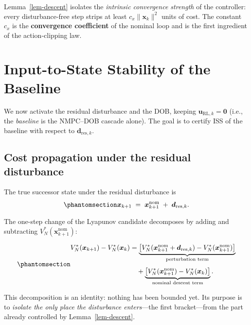 \documentclass[
  11pt,
]{article}
\theoremstyle{plain}
\theoremstyle{plain}
\theoremstyle{definition}
\theoremstyle{remark}
\begin{document}
Lemma~\ref{lem-descent} isolates the \emph{intrinsic convergence
strength} of the controller: every disturbance-free step strips at least
\(c_x\|\bm{x}_k\|^2\) units of cost. The constant \(c_x\) is the
\textbf{convergence coefficient} of the nominal loop and is the first
ingredient of the action-clipping law.

\section{Input-to-State Stability of the Baseline}\label{sec-iss}

We now activate the residual disturbance and the DOB, keeping
\(\bm{u}_{\mathrm{RL},k} = \bm{0}\) (i.e., the \emph{baseline} is the
NMPC--DOB cascade alone). The goal is to certify ISS of the baseline
with respect to \(\bm{d}_{\mathrm{res},k}\).

\subsection{Cost propagation under the residual
disturbance}\label{cost-propagation-under-the-residual-disturbance}

The true successor state under the residual disturbance is
\begin{equation}\protect\phantomsection\label{eq-disturbed-succ}{
\bm{x}_{k+1} \;=\; \bm{x}_{k+1}^{\mathrm{nom}}
\;+\; \bm{d}_{\mathrm{res},k}.
}\end{equation}

The one-step change of the Lyapunov candidate decomposes by adding and
subtracting \(V_N^*(\bm{x}_{k+1}^{\mathrm{nom}})\):

\begin{equation}\protect\phantomsection\label{eq-split}{
\begin{aligned}
V_N^*(\bm{x}_{k+1}) - V_N^*(\bm{x}_k)
&= \underbrace{\bigl[V_N^*(\bm{x}_{k+1}^{\mathrm{nom}}
                 + \bm{d}_{\mathrm{res},k})
        - V_N^*(\bm{x}_{k+1}^{\mathrm{nom}})\bigr]}_{\text{perturbation term}}
\\[4pt]
&\quad+ \underbrace{\bigl[V_N^*(\bm{x}_{k+1}^{\mathrm{nom}})
        - V_N^*(\bm{x}_k)\bigr]}_{\text{nominal descent term}}.
\end{aligned}
}\end{equation}

This decomposition is an identity: nothing has been bounded yet. Its
purpose is to \emph{isolate the only place the disturbance enters}---the
first bracket---from the part already controlled by
Lemma~\ref{lem-descent}.
\end{document}
